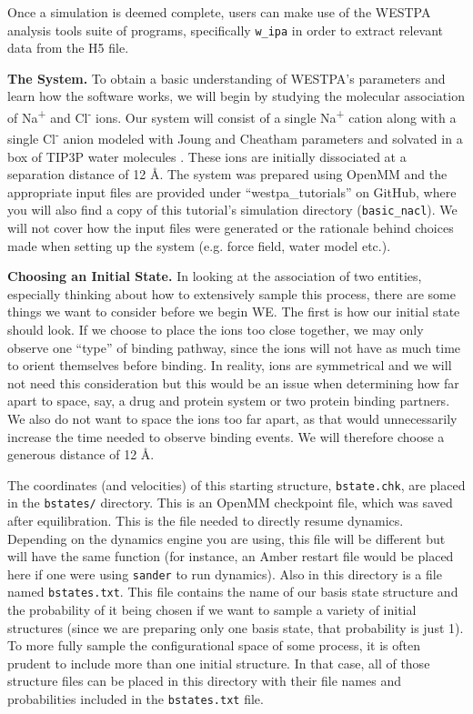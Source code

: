 \documentclass[9pt,tutorial,pubversion]{livecoms}
\begin{document}
Once a simulation is deemed complete, users can make use of the WESTPA analysis tools suite of programs, specifically \verb|w_ipa| in order to extract relevant data from the H5 file.

\textbf{The System.} To obtain a basic understanding of WESTPA’s parameters and learn how the software works, we will begin by studying the molecular association of Na\textsuperscript{+} and Cl\textsuperscript{-} ions. 
Our system will consist of a single Na\textsuperscript{+} cation along with a single Cl\textsuperscript{-} anion modeled with Joung and Cheatham parameters \citep{JoungCheatham2009} and solvated in a box of TIP3P water molecules \citep{tip3p}. 
These ions are initially dissociated at a separation distance of 12 \AA. 
The system was prepared using OpenMM and the appropriate input files are provided under “westpa\_tutorials” on GitHub, where you will also find a copy of this tutorial’s simulation directory (\verb|basic_nacl|). 
We will not cover how the input files were generated or the rationale behind choices made when setting up the system (e.g. force field, water model etc.).


\textbf{Choosing an Initial State.} In looking at the association of two entities, especially thinking about how to extensively sample this process, there are some things we want to consider before we begin WE.
The first is how our initial state should look. If we choose to place the ions too close together, we may only observe one “type” of binding pathway, since the ions will not have as much time to orient themselves before binding. 
In reality, ions are symmetrical and we will not need this consideration but this would be an issue when determining how far apart to space, say, a drug and protein system or two protein binding partners. 
We also do not want to space the ions too far apart, as that would unnecessarily increase the time needed to observe binding events. 
We will therefore choose a generous distance of 12 \AA.

The coordinates (and velocities) of this starting structure, \verb|bstate.chk|, are placed in the \verb|bstates/| directory. 
This is an OpenMM checkpoint file, which was saved after equilibration.  
This is the file needed to directly resume dynamics.  
Depending on the dynamics engine you are using, this file will be different but will have the same function (for instance, an Amber restart file would be placed here if one were using \verb|sander| to run dynamics).
Also in this directory is a file named \verb|bstates.txt|. 
This file contains the name of our basis state structure and the probability of it being chosen if we want to sample a variety of initial structures (since we are preparing only one basis state, that probability is just 1). 
To more fully sample the configurational space of some process, it is often prudent to include more than one initial structure. 
In that case, all of those structure files can be placed in this directory with their file names and probabilities included in the \verb|bstates.txt| file.
\end{document}
